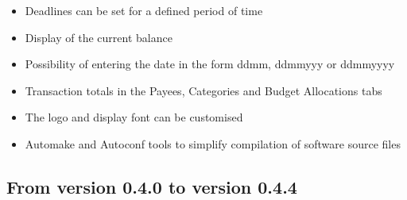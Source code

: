 \begin{itemize}
	\item Deadlines can be set for a defined period of time%
	\item Display of the current balance%
	\item Possibility of entering the date in the form ddmm, ddmmyyy or ddmmyyyy%
	\item Transaction totals in the Payees, Categories and Budget Allocations tabs%
	\item The logo and display font can be customised%
	\item Automake and Autoconf tools to simplify compilation of software source files%
\end{itemize}

\subsection{From version 0.4.0 to version 0.4.4}

